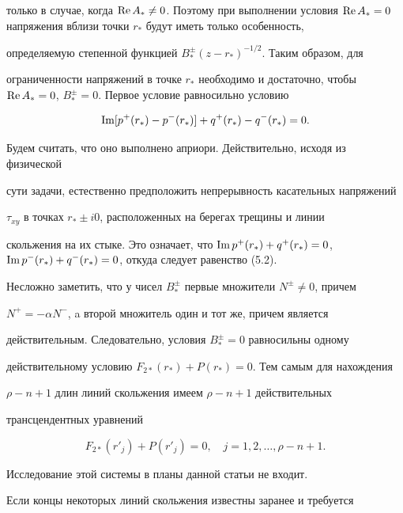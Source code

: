 только в случае, когда $\re A_*\ne0$. Поэтому при выполнении условия $\re 


A_*=0$ напряжения вблизи точки $r_*$ будут иметь только особенность, 


определяемую степенной функцией $B^\pm_*(z-r_*)^{-1/2}$. Таким образом, для 


ограниченности напряжений в точке $r_*$ необходимо и достаточно, чтобы $\re 


A_*=0$, $B^\pm_*=0$. Первое условие равносильно условию 


\begin{equation} 


\im[p^+(r_*)-p^-(r_*)]+q^+(r_*)-q^-(r_*)=0. 


\end{equation} 


Будем считать, что оно выполнено априори. Действительно, исходя из физической 


сути задачи, естественно предположить непрерывность касательных напряжений 


$\tau_{xy}$ в точках $r_*\pm i0$, расположенных на берегах трещины и линии 


скольжения на их стыке. Это означает, что $\im p^+(r_*)+q^+(r_*)=0$, $\im 


p^-(r_*)+q^-(r_*)=0$, откуда следует равенство (5.2). 


 


Несложно заметить, что у чисел $B^\pm_*$ первые множители $N^\pm\ne0$, причем 


$N^+=-\alpha N^-$, a второй множитель один и тот же, причем является 


действительным. Следовательно, условия $B^\pm_*=0$ равносильны одному 


действительному условию $F_{2\ast}(r_*)+P(r_*)=0$. Тем самым для нахождения 


$\rho-n+1$ длин линий скольжения имеем $\rho-n+1$ действительных 


трансцендентных уравнений 


$$ 


F_{2\ast}(r'_j)+P(r'_j)=0,\quad j=1,2,\dotsc,\rho-n+1. 


$$ 


Исследование этой системы в планы данной статьи не входит. 


 


Если концы некоторых линий скольжения известны заранее и требуется 


